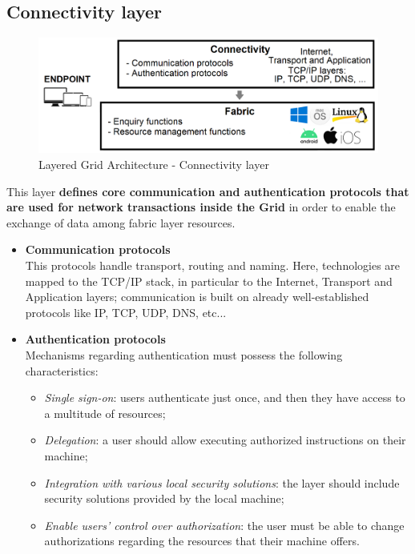 \subsection{Connectivity layer}\label{connectivity_layer}
\begin{figure}[!ht]
    \centering
    \includegraphics[scale=0.35]{document/chapters/chapter_2/images/connectivity_layer.png}
    \caption{Layered Grid Architecture - Connectivity layer}
    \label{fig:connectivity_layer}
\end{figure}
\vspace{5mm}

\noindent This layer \textbf{defines core communication and authentication protocols that are used for network transactions inside the Grid} in order to enable the exchange of data among fabric layer resources.
\begin{itemize}
    \item \textbf{Communication protocols}\\
    This protocols handle transport, routing and naming. Here, technologies are mapped to the TCP/IP stack, in particular to the Internet, Transport and Application layers; communication is built on already well-established protocols like IP, TCP, UDP, DNS, etc... 
    \item \textbf{Authentication protocols}\\
    Mechanisms regarding authentication must possess the following characteristics:
    \begin{itemize}
        \item \textit{Single sign-on}: users authenticate just once, and then they have access to a multitude of resources;
        \item \textit{Delegation}: a user should allow executing authorized instructions on their machine; 
        \item \textit{Integration with various local security solutions}: the layer should include security solutions provided by the local machine;
        \item \textit{Enable users' control over authorization}: the user must be able to change authorizations regarding the resources that their machine offers.
    \end{itemize}
\end{itemize}


